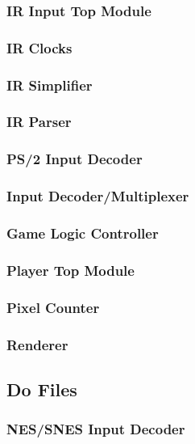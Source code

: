 \documentclass[]{article}
\begin{document}
\subsubsection{IR Input Top Module}

\subsubsection{IR Clocks}

\subsubsection{IR Simplifier}

\subsubsection{IR Parser}

\subsubsection{PS/2 Input Decoder}

\subsubsection{Input Decoder/Multiplexer}

\subsubsection{Game Logic Controller}

\subsubsection{Player Top Module}

\subsubsection{Pixel Counter}

\subsubsection{Renderer}

\subsection{Do Files}
\subsubsection{NES/SNES Input Decoder}

\end{document}
